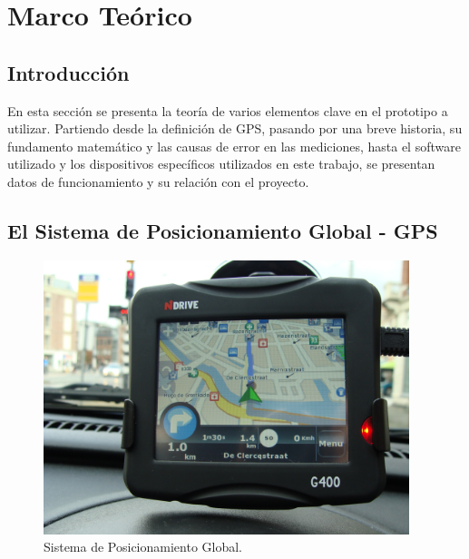 
\chapter{Marco Teórico} %

\label{Chap:Marco} %




\section{Introducción}

En esta sección se presenta la teoría de varios elementos clave en el prototipo a utilizar. Partiendo desde la definición de GPS, pasando por una breve historia, su fundamento matemático y las causas de error en las mediciones, hasta el software utilizado y los dispositivos específicos utilizados en este trabajo, se presentan datos de funcionamiento y su relación con el proyecto.

\section{El Sistema de Posicionamiento Global - GPS}

\begin{figure}[ht]
\centering
\includegraphics[width=0.95\textwidth]{Figures/GPS}
\caption[Sistema de Posicionamiento Global.]{Sistema de Posicionamiento Global.\footnotemark}
\label{fig:GPS}
\end{figure}


